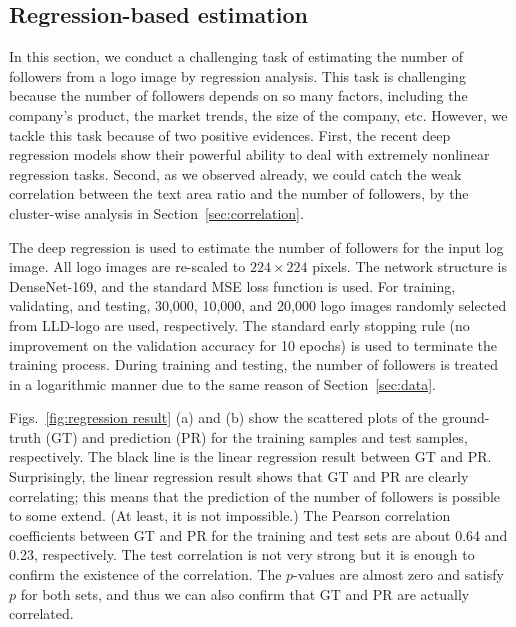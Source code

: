 \documentclass[runningheads]{llncs}
\begin{document}
\subsection{Regression-based estimation}
In this section, we conduct a challenging task of estimating the number of followers from a logo image by regression analysis. This task is challenging because the number of followers depends on so many factors, including the company's product, the market trends, the size of the company, etc. However, we tackle this task because of two positive evidences. First, the recent deep regression models show their powerful ability to deal with extremely nonlinear regression tasks. Second, as we observed already, we could catch the weak correlation between the text area ratio and the number of followers, by the cluster-wise analysis in Section~\ref{sec:correlation}. \par
%
The deep regression is used to estimate the number of followers for the input log image. All logo images are re-scaled to $224\times 224$ pixels. 
The network structure is DenseNet-169, and the standard MSE loss function is used.
For training, validating, and testing, 30,000, 10,000, and 20,000 logo images randomly selected from LLD-logo are used, respectively. The standard early stopping rule (no improvement on the validation accuracy for 10 epochs) is used to terminate the training process. During training and testing, the number of followers is treated in a logarithmic manner due to the same reason of Section~\ref{sec:data}.
\par
Figs.~\ref{fig:regression result} (a) and (b) show the scattered plots of the ground-truth (GT) and prediction (PR) for the training samples and test samples, respectively. The black line is the linear regression result between GT and PR. Surprisingly, the linear regression result shows that 
GT and PR are clearly correlating; this means that the prediction of the number of followers is possible to some extend. (At least, it 
is not impossible.) The Pearson correlation coefficients between GT and PR for the training and test sets are about 0.64 and 0.23, respectively. The test correlation is not very strong but it is enough to confirm the existence of the correlation.
The $p$-values are almost zero and satisfy $p$ for both sets, and thus we can also confirm that GT and PR are actually correlated. \par
\end{document}
